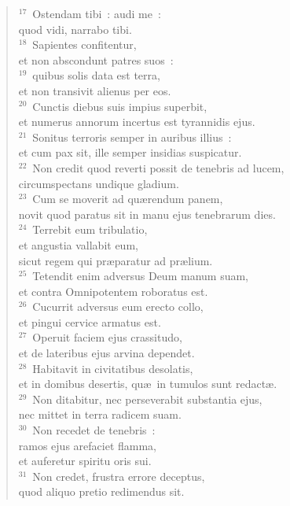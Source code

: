 \begin{flushleft}
\begin{verse}
${}^{17}$~Ostendam tibi~: audi me~:\\ quod vidi, narrabo tibi.\\
${}^{18}$~Sapientes confitentur,\\ et non abscondunt patres suos~:\\
${}^{19}$~quibus solis data est terra,\\ et non transivit alienus per eos.\\
${}^{20}$~Cunctis diebus suis impius superbit,\\ et numerus annorum incertus est tyrannidis ejus.\\
${}^{21}$~Sonitus terroris semper in auribus illius~:\\ et cum pax sit, ille semper insidias suspicatur.\\
${}^{22}$~Non credit quod reverti possit de tenebris ad lucem,\\ circumspectans undique gladium.\\
${}^{23}$~Cum se moverit ad qu\ae rendum panem,\\ novit quod paratus sit in manu ejus tenebrarum dies.\\
${}^{24}$~Terrebit eum tribulatio,\\ et angustia vallabit eum,\\ sicut regem qui pr\ae paratur ad pr\ae lium.\\
${}^{25}$~Tetendit enim adversus Deum manum suam,\\ et contra Omnipotentem roboratus est.\\
${}^{26}$~Cucurrit adversus eum erecto collo,\\ et pingui cervice armatus est.\\
${}^{27}$~Operuit faciem ejus crassitudo,\\ et de lateribus ejus arvina dependet.\\
${}^{28}$~Habitavit in civitatibus desolatis,\\ et in domibus desertis, qu\ae\ in tumulos sunt redact\ae .\\
${}^{29}$~Non ditabitur, nec perseverabit substantia ejus,\\ nec mittet in terra radicem suam.\\
${}^{30}$~Non recedet de tenebris~:\\ ramos ejus arefaciet flamma,\\ et auferetur spiritu oris sui.\\
${}^{31}$~Non credet, frustra errore deceptus,\\ quod aliquo pretio redimendus sit.\\

\end{verse}
\end{flushleft}
